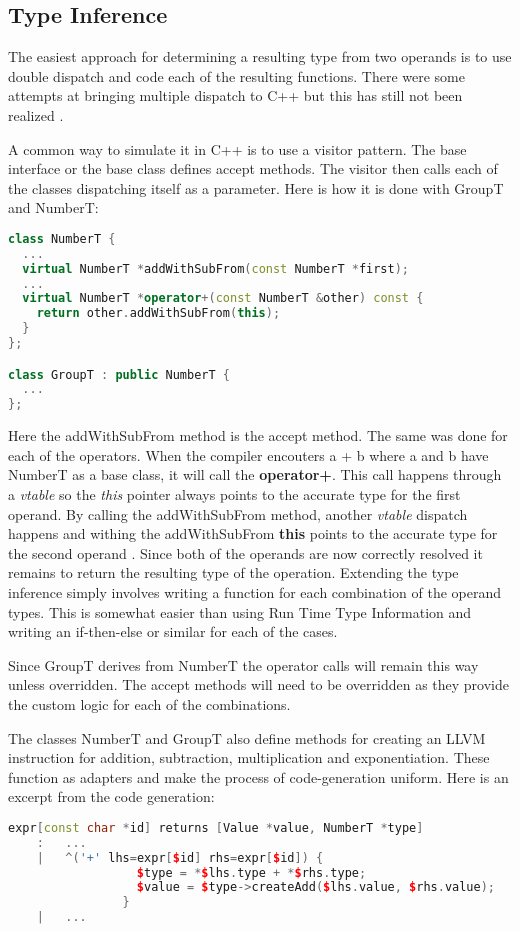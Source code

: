 \subsection{Type Inference}

The easiest approach for determining a resulting type from two
operands is to use double dispatch and code each of the resulting
functions.  There were some attempts at bringing multiple dispatch to
C++ but this has still not been realized \cite{c++_multi_methods}.

A common way to simulate it in C++ is to use a visitor pattern. The
base interface or the base class defines accept methods. The visitor
then calls each of the classes dispatching itself as a parameter. Here
is how it is done with GroupT and NumberT:

\begin{lstlisting}[language=C++]
class NumberT {
  ...
  virtual NumberT *addWithSubFrom(const NumberT *first);
  ...
  virtual NumberT *operator+(const NumberT &other) const {
    return other.addWithSubFrom(this);
  }
};

class GroupT : public NumberT {
  ...
};
\end{lstlisting}

Here the addWithSubFrom method is the accept method.  The same was
done for each of the operators. When the compiler encouters a + b
where a and b have NumberT as a base class, it will call the
\textbf{operator+}. This call happens through a \emph{vtable} so the
\emph{this} pointer always points to the accurate type for the first
operand. By calling the addWithSubFrom method, another \emph{vtable}
dispatch happens and withing the addWithSubFrom \textbf{this} points
to the accurate type for the second operand \cite{Eckel}. Since both
of the operands are now correctly resolved it remains to return the
resulting type of the operation. Extending the type inference simply
involves writing a function for each combination of the operand
types. This is somewhat easier than using Run Time Type Information
and writing an if-then-else or similar for each of the cases.

Since GroupT derives from NumberT the operator calls will remain this
way unless overridden. The accept methods will need to be overridden
as they provide the custom logic for each of the combinations.

The classes NumberT and GroupT also define methods for creating an
LLVM instruction for addition, subtraction, multiplication and
exponentiation. These function as adapters and make the process of
code-generation uniform. Here is an excerpt from the code generation:
\begin{lstlisting}[language=C++, morekeywords=expr]
expr[const char *id] returns [Value *value, NumberT *type]
	:	...
	|	^('+' lhs=expr[$id] rhs=expr[$id]) {
                  $type = *$lhs.type + *$rhs.type;
                  $value = $type->createAdd($lhs.value, $rhs.value);
                }
	|	...
\end{lstlisting}

